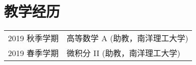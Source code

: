 \section*{教学经历}
\begin{tabular}{p{} p{}}
2019 秋季学期 & 高等数学 A (助教，南洋理工大学) \\
2019 春季学期 & 微积分 II (助教，南洋理工大学)
\end{tabular}
